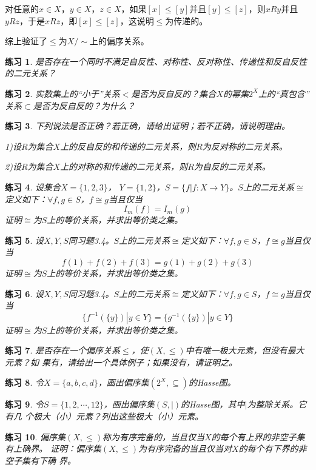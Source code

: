\documentclass{book}[oneside]
\newtheorem{Exercise}{练习}[chapter]
\begin{document}
\begin{CJK*}{UTF8}{gbsn}
  对任意的$x\in X$，$y\in X$，$z\in X$，如果$[x] \leq [y]$并且$[y] \leq [z]$，则$xRy$并且$yRz$，于是$xRz$，即$[x]\leq [z]$，这说明$\leq$为传递的。

  综上验证了$\leq$为$X/\sim$上的偏序关系。

  \begin{Exercise}
  是否存在一个同时不满足自反性、对称性、反对称性、传递性和反自反性的二元关系？    
  \end{Exercise}
  \begin{Exercise}
  实数集上的“小于”关系$<$是否为反自反的？集合$X$的幂集$2^X$上的“真包含”
  关系$\subset$是否为反自反的？为什么？    
  \end{Exercise}

  \begin{Exercise}
  下列说法是否正确？若正确，请给出证明；若不正确，请说明理由。
  
  1)设$R$为集合$X$上的反自反的和传递的二元关系，则$R$为反对称的二元关系。
  
  2)设$R$为集合$X$上的对称的和传递的二元关系，则$R$为自反的二元关系。    
  \end{Exercise}

    \begin{Exercise}
  设集合$X = \{1,2,3\}$， $Y = \{1,2\}$，$S = \{f|f:X \to Y\}$。$S$上的二元关系$\cong$定义如下：$\forall f,g\in S$，$f \cong g$当且仅当\[I_m(f) = I_m(g)\]证明$\cong$为$S$上的等价关系，并求出等价类之集。    
  \end{Exercise}
  \begin{Exercise}
  设$X, Y, S$同习题3.4。$S$上的二元关系$\cong$定义如下：$\forall f,g\in S$，$f \cong g$当且仅当\[f(1) + f(2) + f(3) = g(1) + g(2) + g(3)\]证明$\cong$为$S$上的等价关系，并求出等价类之集。    
  \end{Exercise}
 \begin{Exercise}
  设$X, Y, S$同习题3.4。$S$上的二元关系$\cong$定义如下：$\forall f,g\in S$，$f \cong g$当且仅当\[\{f^{-1}(\{y\}) | y \in Y\} = \{g^{-1}(\{y\})|y \in Y\}\]证明$\cong$为$S$上的等价关系，并求出等价类之集。  
\end{Exercise}

  \begin{Exercise}
    是否存在一个偏序关系$\leq$，使$(X,\leq)$中有唯一极大元素，但没有最大元素？如
    果有，请给出一个具体例子；如果没有，请证明之。
  \end{Exercise}
  \begin{Exercise}
    令$X=\{a,b,c,d\}$，画出偏序集$(2^X,\subseteq)$的Hasse图。
  \end{Exercise}
 \begin{Exercise}
 令$S=\{1,2,\cdots,12\}$，画出偏序集$(S,|)$的Hasse图，其中$|$为整除关系。它有几
 个极大（小）元素？列出这些极大（小）元素。
  \end{Exercise}
  \begin{Exercise}
    偏序集$(X,\leq)$称为有序完备的，当且仅当$X$的每个有上界的非空子集有上确界。
    证明：偏序集$(X,\leq)$为有序完备的当且仅当对$X$的每个有下界的非空子集有下确
    界。
  \end{Exercise}


      \chapter{}

\end{CJK*}
\end{document}
